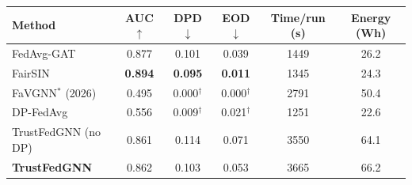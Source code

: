 \begin{tabular}{lccccc}
\toprule
Method & AUC $\uparrow$ & DPD $\downarrow$ & EOD $\downarrow$ & Time/run (s) & Energy (Wh) \\
\midrule
FedAvg-GAT & 0.877 & 0.101 & 0.039 & 1449 & 26.2 \\
FairSIN & \textbf{0.894} & \textbf{0.095} & \textbf{0.011} & 1345 & 24.3 \\
FaVGNN$^{\ast}$ (2026) & 0.495 & 0.000$^{\dagger}$ & 0.000$^{\dagger}$ & 2791 & 50.4 \\
DP-FedAvg & 0.556 & 0.009$^{\dagger}$ & 0.021$^{\dagger}$ & 1251 & 22.6 \\
TrustFedGNN (no DP) & 0.861 & 0.114 & 0.071 & 3550 & 64.1 \\
\textbf{TrustFedGNN} & 0.862 & 0.103 & 0.053 & 3665 & 66.2 \\
\bottomrule
\end{tabular}
